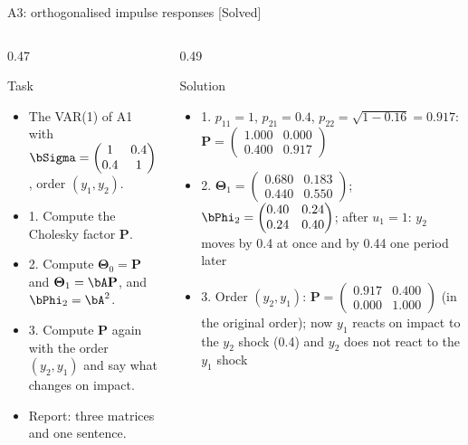 \begin{frame}{A3: orthogonalised impulse responses [Solved]}
\itemsize{\scriptsize}
\begin{columns}[T]
\begin{column}{0.47\textwidth}
\begin{block}{Task}
\begin{itemize}
    \item The VAR(1) of A1 with $\bSigma = \begin{pmatrix} 1 & 0.4 \\ 0.4 & 1 \end{pmatrix}$, order $(y_1, y_2)$.
    \item 1. Compute the Cholesky factor $\mathbf{P}$.
    \item 2. Compute $\boldsymbol{\Theta}_0 = \mathbf{P}$ and $\boldsymbol{\Theta}_1 = \bA\mathbf{P}$, and $\bPhi_2 = \bA^2$.
    \item 3. Compute $\mathbf{P}$ again with the order $(y_2, y_1)$ and say what changes on impact.
    \item Report: three matrices and one sentence.
\end{itemize}
\end{block}
\end{column}
\begin{column}{0.49\textwidth}
\begin{exampleblock}{Solution}
\begin{itemize}
    \item 1. $p_{11} = 1$, $p_{21} = 0.4$, $p_{22} = \sqrt{1 - 0.16} = 0.917$: $\mathbf{P} = \begin{pmatrix} 1.000 & 0.000 \\ 0.400 & 0.917 \end{pmatrix}$
    \item 2. $\boldsymbol{\Theta}_1 = \begin{pmatrix} 0.680 & 0.183 \\ 0.440 & 0.550 \end{pmatrix}$; $\bPhi_2 = \begin{pmatrix} 0.40 & 0.24 \\ 0.24 & 0.40 \end{pmatrix}$; after $u_1 = 1$: $y_2$ moves by 0.4 at once and by 0.44 one period later
    \item 3. Order $(y_2, y_1)$: $\mathbf{P} = \begin{pmatrix} 0.917 & 0.400 \\ 0.000 & 1.000 \end{pmatrix}$ (in the original order); now $y_1$ reacts on impact to the $y_2$ shock (0.4) and $y_2$ does not react to the $y_1$ shock
\end{itemize}
\end{exampleblock}
\end{column}
\end{columns}
\end{frame}

